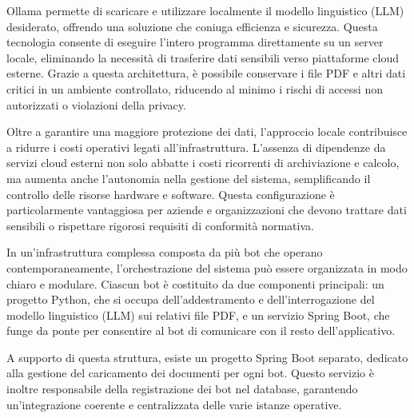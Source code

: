 \documentclass[a4paper,twoside,12pt]{toptesi}
\begin{document}
Ollama permette di scaricare e utilizzare localmente il modello linguistico (LLM) desiderato, offrendo una soluzione che coniuga efficienza e sicurezza. Questa tecnologia consente di eseguire l'intero programma direttamente su un server locale, eliminando la necessità di trasferire dati sensibili verso piattaforme cloud esterne. Grazie a questa architettura, è possibile conservare i file PDF e altri dati critici in un ambiente controllato, riducendo al minimo i rischi di accessi non autorizzati o violazioni della privacy.

Oltre a garantire una maggiore protezione dei dati, l'approccio locale contribuisce a ridurre i costi operativi legati all'infrastruttura. L'assenza di dipendenze da servizi cloud esterni non solo abbatte i costi ricorrenti di archiviazione e calcolo, ma aumenta anche l'autonomia nella gestione del sistema, semplificando il controllo delle risorse hardware e software. Questa configurazione è particolarmente vantaggiosa per aziende e organizzazioni che devono trattare dati sensibili o rispettare rigorosi requisiti di conformità normativa.


\begin{center}

\end{center}

In un'infrastruttura complessa composta da più bot che operano contemporaneamente, l'orchestrazione del sistema può essere organizzata in modo chiaro e modulare. Ciascun bot è costituito da due componenti principali: un progetto Python, che si occupa dell'addestramento e dell'interrogazione del modello linguistico (LLM) sui relativi file PDF, e un servizio Spring Boot, che funge da ponte per consentire al bot di comunicare con il resto dell'applicativo.

A supporto di questa struttura, esiste un progetto Spring Boot separato, dedicato alla gestione del caricamento dei documenti per ogni bot. Questo servizio è inoltre responsabile della registrazione dei bot nel database, garantendo un'integrazione coerente e centralizzata delle varie istanze operative.
\end{document}
